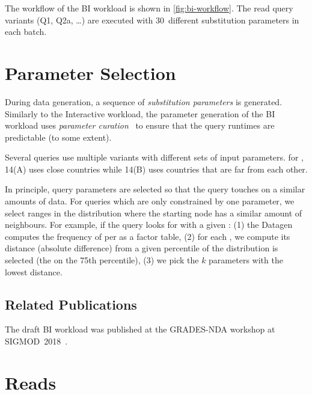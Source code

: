 The workflow of the BI workload is shown in \autoref{fig:bi-workflow}.
The read query variants (Q1, Q2a, \ldots) are executed with 30~different substitution parameters in each batch.

\section{Parameter Selection}
\label{sec:bi-paramgen}

During data generation, a sequence of \emph{substitution parameters}
\iftoggle{StandaloneWorkloadSpecification}{}{(\autoref{sec:substitution-parameters})}
is generated.
Similarly to the Interactive workload, the parameter generation of the BI workload uses \emph{parameter curation}~\cite{DBLP:conf/tpctc/GubichevB14} to ensure that the query runtimes are  predictable (to some extent).

Several queries use multiple variants with different sets of input parameters.
\Eg for , 14(A) uses close countries while 14(B) uses countries that are far from each other.

In principle, query parameters are selected so that the query touches on a similar amounts of data.
For queries which are only constrained by one parameter, we select ranges in the distribution where the starting node has a similar amount of neighbours.
For example, if the query looks for \tMessages with a given \tTag:
(1) the Datagen computes the frequency of \tMessages per \tTags as a factor table,
(2) for each \tTag, we compute its distance (absolute difference) from a given percentile of the distribution is selected (\eg the \tTag on the 75th percentile),
(3) we pick the $k$ parameters with the lowest distance.

\subsection*{Related Publications}

The draft BI workload was published at the \mbox{GRADES-NDA} workshop at \mbox{SIGMOD 2018}~\cite{DBLP:conf/grades/SzarnyasPAMPKEB18}.


\section{Reads}
\label{sec:bi-reads}

